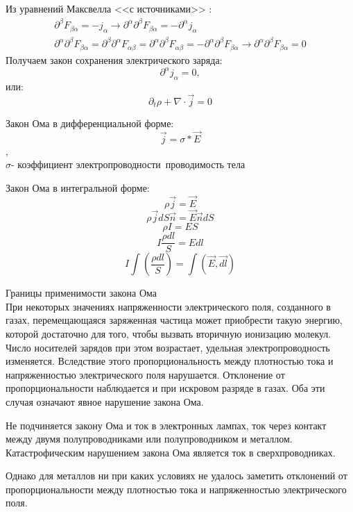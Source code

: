 \documentclass[__main__.tex]{subfiles}
\begin{document}
Из уравнений Максвелла <<с источниками>> :
\begin{gather*}
\partial^\beta F_{\beta\alpha} = -j_\alpha \longrightarrow \partial^\alpha\partial^\beta F_{\beta\alpha} = -\partial^\alpha j_\alpha\\
\partial^\alpha\partial^\beta F_{\beta\alpha} = \partial^\beta\partial^\alpha F_{\alpha\beta} = \partial^\alpha\partial^\beta F_{\alpha\beta} = - \partial^\alpha\partial^\beta F_{\beta\alpha} \longrightarrow \partial^\alpha\partial^\beta F_{\beta\alpha} = 0
\end{gather*}
Получаем закон сохранения электрического заряда:
$$\partial^\alpha j_\alpha = 0,$$
или:
$$\partial_t\rho + \nabla \cdot \vec j = 0$$

\begin{definition}
	Закон Ома в дифференциальной форме:
	$$\vec{j}=σ*\vec{E}$$,
	\\$σ$- коэффициент электропроводности\ проводимость тела
\end{definition}
\begin{definition}
	Закон Ома в интегральной форме:
	$$ρ\vec{j}=\vec{E}$$
	$$ρ\vec{j}dS\vec{n}=\vec{E}\vec{n}dS$$
	$$ρI=ES$$
	$$I\frac{ρdl}{S}=Edl$$
	$$I\int(\frac{ρdl}{S})=\int(\vec{E},\vec{dl})$$
\end{definition}
Границы применимости закона Ома\\

При некоторых значениях напряженности электрического поля, созданного в газах, перемещающаяся заряженная частица может приобрести такую энергию, которой достаточно для того, чтобы вызвать вторичную ионизацию молекул. Число носителей зарядов при этом возрастает, удельная электропроводность изменяется. Вследствие этого пропорциональность между плотностью тока и напряженностью электрического поля нарушается. Отклонение от пропорциональности наблюдается и при искровом разряде в газах. Оба эти случая означают явное нарушение закона Ома.

Не подчиняется закону Ома и ток в электронных лампах, ток через контакт между двумя полупроводниками или полупроводником и металлом. Катастрофическим нарушением закона Ома является ток в сверхпроводниках.

Однако для металлов ни при каких условиях не удалось заметить отклонений от пропорциональности между плотностью тока и напряженностью электрического поля.
\end{document}
